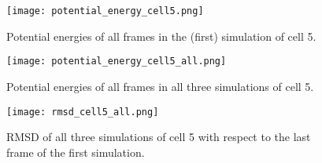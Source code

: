 \begin{figure}[ht]
\centering
  \texttt{[image: potential\_energy\_cell5.png]}
  \caption{Potential energies of all frames in the (first) simulation of cell 5.}
  \label{fig:potential_energy_cell5}
\end{figure}

\begin{figure}[ht]
\centering
  \texttt{[image: potential\_energy\_cell5\_all.png]}
  \caption{Potential energies of all frames in all three simulations of cell 5.}
  \label{fig:potential_energy_cell5_all}
\end{figure}

\begin{figure}[ht]
\centering
  \texttt{[image: rmsd\_cell5\_all.png]}
  \caption{RMSD of all three simulations of cell 5 with respect to the last frame of the first simulation.}
  \label{fig:rmsd_cell5_all}
\end{figure}




